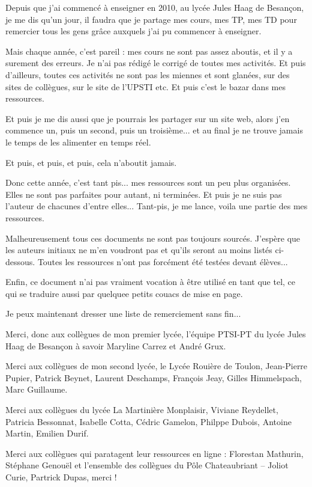 Depuis que j'ai commencé à enseigner en 2010, au lycée Jules Haag de Besançon, je me dis qu'un jour, il faudra que je partage mes cours, mes TP, mes TD pour remercier tous les gens grâce auxquels j'ai pu commencer à enseigner. 

Mais chaque année, c'est pareil : mes cours ne sont pas assez aboutis, et il y a surement des erreurs. Je n'ai pas rédigé le corrigé de toutes mes activités. Et puis d'ailleurs, toutes ces activités ne sont pas les miennes et sont glanées, sur des sites de collègues, sur le site de l'UPSTI etc. Et puis c'est le bazar dans mes ressources. 

Et puis je me dis aussi que je pourrais les partager sur un site web, alors j'en commence un, puis un second, puis un troisième... et au final je ne trouve jamais le temps de les alimenter en temps réel. 

Et puis, et puis, et puis, cela n'aboutit jamais. 

Donc cette année, c'est tant pis... mes ressources sont un peu plus organisées. Elles ne sont pas parfaites pour autant, ni terminées. Et puis je ne suis pas l'auteur de chacunes d'entre elles... Tant-pis, je me lance, voila une partie des mes ressources.

Malheureusement tous ces documents ne sont pas toujours sourcés. J'espère que les auteurs initiaux ne m'en voudront pas et qu'ils seront au moins listés ci-dessous. Toutes les ressources n'ont pas forcément été testées devant élèves...  

Enfin, ce document n'ai pas vraiment vocation à être utilisé en tant que tel, ce qui se traduire aussi par quelquee petits couacs de mise en page.

Je peux maintenant dresser une liste de remerciement sans fin...

Merci, donc aux collègues de mon premier lycée, l'équipe PTSI-PT du lycée Jules Haag de Besançon à savoir Maryline Carrez et André Grux. 

Merci aux collègues de mon second lycée, le Lycée Rouière de Toulon, Jean-Pierre Pupier, Patrick Beynet, Laurent Deschamps, François Jeay, Gilles Himmelspach, Marc Guillaume.

Merci aux collègues du lycée La Martinière Monplaisir, Viviane Reydellet, Patricia Bessonnat, Isabelle Cotta, Cédric Gamelon, Philppe Dubois, Antoine Martin, Emilien Durif.

Merci aux collègues qui paratagent leur ressources en ligne : Florestan Mathurin, Stéphane Genouël et l'ensemble des collègues du Pôle Chateaubriant -- Joliot Curie, Partrick Dupas, merci !

